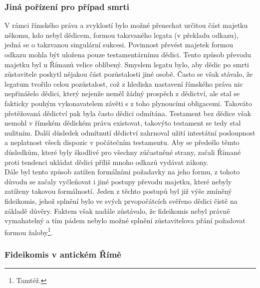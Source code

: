 \documentclass{article}
\begin{document}

\subsubsection{Jiná pořízení pro případ smrti}

V rámci římského práva a zvyklostí bylo možné přenechat určitou část majetku někomu, kdo nebyl dědicem, formou takzvaného legata (v překladu odkazu), jedná se o takzvanou singulární sukcesi. Povinnost převést majetek formou odkazu mohla být uložena pouze testamentárnímu dědici. Tento způsob převodu majetku byl u Římanů velice oblíbený. Smyslem legatu bylo, aby dědic po smrti zůstavitele poskytl nějakou část pozůstalosti jiné osobě. Často se však stávalo, že legatum tvořilo celou pozůstalost, což z hlediska nastavení římského práva nic nepřinášelo dědici, který nejenže neměl žádný prospěch z dědictví, ale stal se fakticky pouhým vykonavatelem závěti s z toho plynoucími obligacemi. Takováto přetěžovaná dědictví pak byla často dědici odmítána. Testament bez dědice však nemohl v římském dědickém právu existovat, takovýto testament se tedy stal nulitním. Další důsledek odmítnutí dědictví zahrnoval užití intestátní posloupnost a neplatnost všech dispozic v počátečním testamentu. Aby se předešlo těmto důsledkům, které byly škodlivé pro všechny zúčastněné strany, začali Římané proti tendenci ukládat dědici příliš mnoho odkazů vydávat zákony.\\


Dále byl tento způsob zatížen formálními požadavky na jeho formu, z tohoto důvodu se začaly vyčleňovat i jiné postupy převodu majetku, které nebyly zatíženy takovou formálností. Jeden z těchto postupů byl již výše zmíněný fideikomis, jehož splnění bylo ve svých prvopočátcích svěřeno dědici čistě na základě důvěry. Faktem však nadále zůstávalo, že fideikomis nebyl právně vymahatelný a tím pádem nebylo možné splnění zůstavitelova přání požadovat formou žaloby\footnote{Tamtéž.}.\\


\subsubsection{Fideikomis v antickém Římě}
\end{document}
